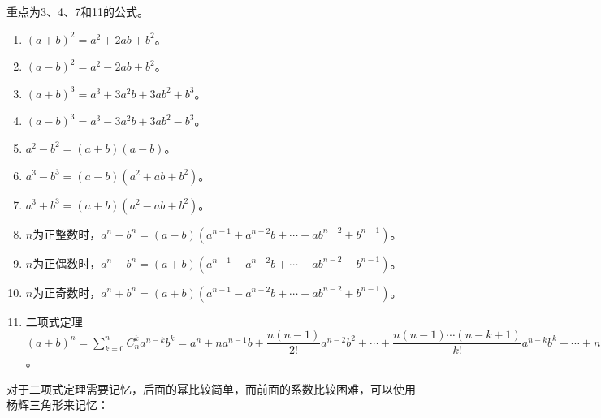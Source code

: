 重点为3、4、7和11的公式。

\begin{enumerate}
    \item $(a+b)^2=a^2+2ab+b^2$。
    \item $(a-b)^2=a^2-2ab+b^2$。
    \item $(a+b)^3=a^3+3a^2b+3ab^2+b^3$。
    \item $(a-b)^3=a^3-3a^2b+3ab^2-b^3$。
    \item $a^2-b^2=(a+b)(a-b)$。
    \item $a^3-b^3=(a-b)(a^2+ab+b^2)$。
    \item $a^3+b^3=(a+b)(a^2-ab+b^2)$。
    \item $n$为正整数时，$a^n-b^n=(a-b)(a^{n-1}+a^{n-2}b+\cdots+ab^{n-2}+b^{n-1})$。
    \item $n$为正偶数时，$a^n-b^n=(a+b)(a^{n-1}-a^{n-2}b+\cdots+ab^{n-2}-b^{n-1})$。
    \item $n$为正奇数时，$a^n+b^n=(a+b)(a^{n-1}-a^{n-2}b+\cdots-ab^{n-2}+b^{n-1})$。
    \item 二项式定理$(a+b)^n=\sum_{k=0}^nC_n^ka^{n-k}b^k=a^n+na^{n-1}b+\dfrac{n(n-1)}{2!}a^{n-2}b^2+\cdots+\dfrac{n(n-1)\cdots(n-k+1)}{k!}a^{n-k}b^k+\cdots+nab^{n-1}+b^n$。
\end{enumerate}

对于二项式定理需要记忆，后面的幂比较简单，而前面的系数比较困难，可以使用杨辉三角形来记忆：


